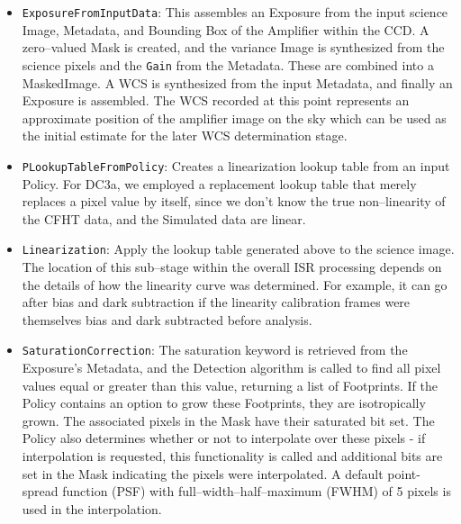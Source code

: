\begin{itemize}

\item \texttt{ExposureFromInputData}: This assembles an Exposure from the
input science Image, Metadata, and Bounding Box of the Amplifier
within the CCD.  A zero--valued Mask is created, and the variance
Image is synthesized from the science pixels and the {\tt Gain} from
the Metadata.  These are combined into a MaskedImage.  A WCS is
synthesized from the input Metadata, and finally an Exposure is
assembled.  The WCS recorded at this point represents an approximate
position of the amplifier image on the sky which can be used as the
initial estimate for the later WCS determination stage.

\item \texttt{PLookupTableFromPolicy}: Creates a linearization lookup table
from an input Policy.
For DC3a, we employed a replacement lookup table that
merely replaces a pixel value by itself, since we don't know the true
non--linearity of the CFHT data, and the Simulated data are linear.

\item \texttt{Linearization}: Apply the lookup table generated above to the
science image.  The location of this sub--stage within the overall ISR
processing depends on the details of how the linearity curve was
determined.  For example, it can go after bias and dark subtraction
if the linearity calibration frames were themselves bias and dark
subtracted before analysis.

\item \texttt{SaturationCorrection}: The saturation keyword is retrieved from
the Exposure's Metadata, and the Detection algorithm is called to find
all pixel values equal or greater than this value, returning a list of
Footprints.  If the Policy contains an option to grow these
Footprints, they are isotropically grown.  The associated pixels in
the Mask have their saturated bit set.  The Policy also determines
whether or not to interpolate over these pixels - if interpolation is
requested, this functionality is called and additional bits are set in
the Mask indicating the pixels were interpolated.  A default
point-spread function (PSF) with full--width--half--maximum (FWHM) of
5 pixels is used in the interpolation.


\end{itemize}
